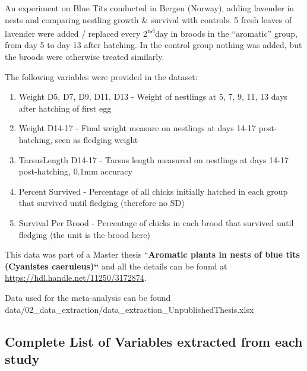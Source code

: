 \documentclass[
  number,
  review,
  onecolumn]{elsarticle}
\providecommand{\tightlist}{%
  \setlength{\itemsep}{0pt}\setlength{\parskip}{0pt}}
\begin{document}
An experiment on Blue Tits conducted in Bergen (Norway), adding lavender
in nests and comparing nestling growth \& survival with controls. 5
fresh leaves of lavender were added / replaced every
2\textsuperscript{nd}day in broods in the ``aromatic'' group, from day 5
to day 13 after hatching. In the control group nothing was added, but
the broods were otherwise treated similarly.

The following variables were provided in the dataset:

\begin{enumerate}
\def\labelenumi{\arabic{enumi}.}
\tightlist
\item
  Weight D5, D7, D9, D11, D13 - Weight of nestlings at 5, 7, 9, 11, 13
  days after hatching of first egg
\item
  Weight D14-17 - Final weight measure on nestlings at days 14-17
  post-hatching, seen as fledging weight
\item
  TarsusLength D14-17 - Tarsus length measured on nestlings at days
  14-17 post-hatching, 0.1mm accuracy
\item
  Percent Survived - Percentage of all chicks initially hatched in each
  group that survived until fledging (therefore no SD)
\item
  Survival Per Brood - Percentage of chicks in each brood that survived
  until fledging (the unit is the brood here)
\end{enumerate}

This data was part of a Master thesis ``\textbf{Aromatic plants in nests
of blue tits (Cyanistes caeruleus)``} \citep{pantazi2024} and all the
details can be found at \url{https://hdl.handle.net/11250/3172874}.

Data used for the meta-analysis can be found
data/02\_data\_extraction/data\_extraction\_UnpublishedThesis.xlsx\\

\subsection{Complete List of Variables extracted from each
study}\label{complete-list-of-variables-extracted-from-each-study}

\begin{figsupp}


\caption{\label{figsupp-variables}}

\end{figsupp}%
\end{document}
